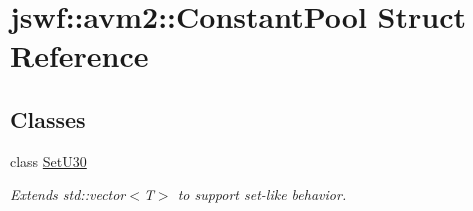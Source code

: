 \hypertarget{structjswf_1_1avm2_1_1_constant_pool}{\section{jswf\+:\+:avm2\+:\+:Constant\+Pool Struct Reference}
\label{structjswf_1_1avm2_1_1_constant_pool}
}
\subsection*{Classes}
\begin{DoxyCompactItemize}
\item 
class \hyperlink{classjswf_1_1avm2_1_1_constant_pool_1_1_set_u30}{Set\+U30}
\begin{DoxyCompactList}\small\item\em Extends std\+::vector$<$\+T$>$ to support set-\/like behavior. \end{DoxyCompactList}\end{DoxyCompactItemize}
